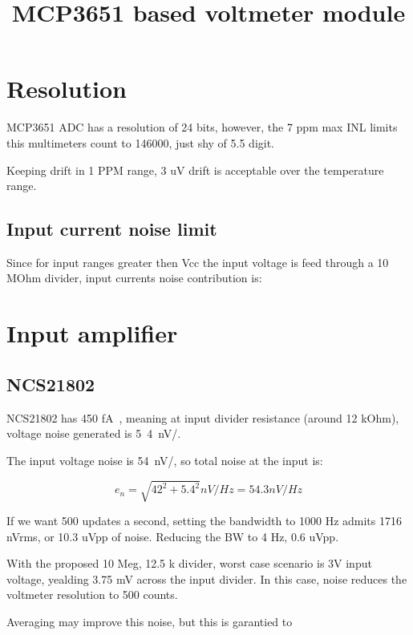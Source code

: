 \documentclass[11pt]{article}
\title{MCP3651 based voltmeter module}
\begin{document}
\maketitle
\pagebreak
\tableofcontents
\pagebreak



\section{Resolution}
MCP3651 ADC has a resolution of 24 bits, however, the 7 ppm max 
INL limits this multimeters count to 146000, just shy of 5.5 digit.

Keeping drift in 1 PPM range, 3 uV drift is acceptable over the 
temperature range.

\subsection{Input current noise limit}
Since for input ranges greater then Vcc the input voltage is feed through
a 10 MOhm divider, input currents noise contribution is:

\section{Input amplifier}

\subsection{NCS21802}
NCS21802 has 450 \si{\femto \ampere \sqrt{\hertz}}, meaning at input divider
resistance (around 12 kOhm), voltage noise generated is \si{5.4 nV/}.

The input voltage noise is \si{54 nV/}, so total noise at the input
is: 

\begin{equation}
  e_n = \sqrt{ 42^2 + 5.4^2} nV/Hz = 54.3 nV/Hz
  \label{eq:NCS218xx input noise}
\end{equation}

If we want 500 updates a second, setting the bandwidth to 1000 Hz admits 
1716 nVrms, or 10.3 uVpp of noise.
Reducing the BW to 4 Hz, 0.6 uVpp.

With the proposed 10 Meg, 12.5 k divider, worst case scenario is 3V input voltage,
yealding 3.75 mV across the input divider. In this case, noise reduces the 
voltmeter resolution to 500 counts.


Averaging may improve this noise, but this is garantied to 
\end{document}
